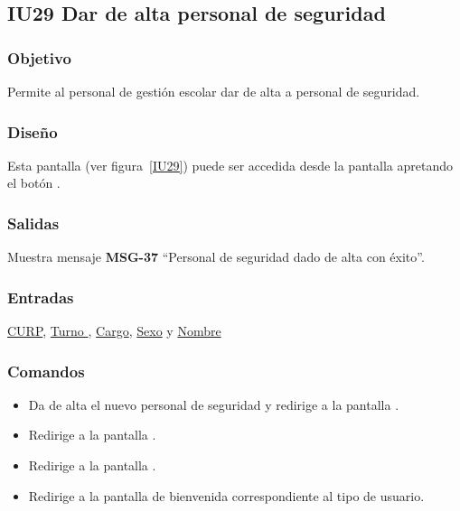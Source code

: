 
\subsection{IU29 Dar de alta personal de seguridad}
\subsubsection{Objetivo}
    Permite al personal de gestión escolar dar de alta a personal de seguridad.
\subsubsection{Diseño}
    Esta pantalla  (ver figura~\ref{IU29}) puede ser accedida desde la pantalla  apretando el botón .

\subsubsection{Salidas}
Muestra mensaje {\bf MSG-37} ``Personal de seguridad dado de alta con éxito''.
\subsubsection{Entradas}
\hyperlink{Personal-de-seguridad.CURP }{CURP}, \hyperlink{personal-de-seguridad.Turno }{Turno }, \hyperlink{ Personal-de-seguridad.Cargo }{Cargo}, \hyperlink{ Personal-de-seguridad.Sexo}{Sexo} y \hyperlink{ Personal-de-seguridad.Nombre}{Nombre} 
\subsubsection{Comandos}
\begin{itemize}
    \item {} Da de alta el nuevo personal de seguridad y redirige a la pantalla .
    \item {} Redirige a la pantalla .
    \item {} Redirige a la pantalla .
    \item {} Redirige a la pantalla de bienvenida correspondiente al tipo de usuario.
    
\end{itemize}

